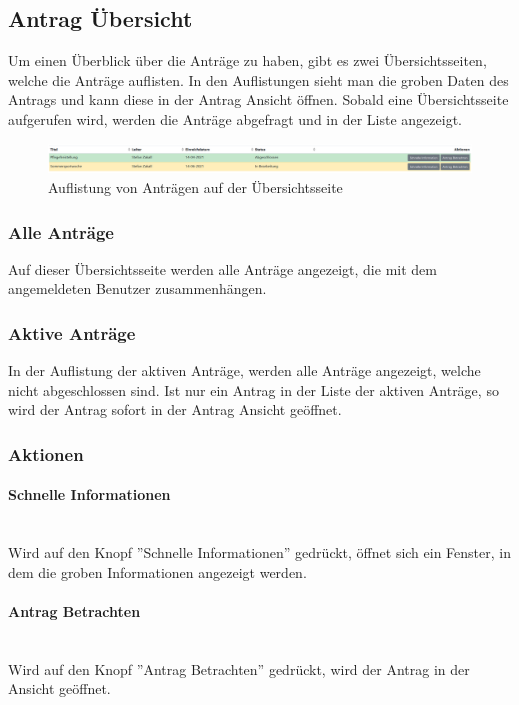 \subsection{Antrag Übersicht}
\label{sec:antrag_uebersicht}
Um einen Überblick über die Anträge zu haben, gibt es zwei Übersichtsseiten, welche die Anträge auflisten. In den Auflistungen sieht man die groben Daten des Antrags und kann diese in der Antrag Ansicht öffnen. Sobald eine Übersichtsseite aufgerufen wird, werden die Anträge abgefragt und in der Liste angezeigt.
\begin{figure}[H]
	\centering
	\includegraphics[width=1\linewidth]{images/liste_antrag}
	\caption[Liste der Anträge]{Auflistung von Anträgen auf der Übersichtsseite}
	\label{fig:listeantrag}
\end{figure}

\subsubsection{Alle Anträge}
Auf dieser Übersichtsseite werden alle Anträge angezeigt, die mit dem angemeldeten Benutzer zusammenhängen.
\subsubsection{Aktive Anträge}
In der Auflistung der aktiven Anträge, werden alle Anträge angezeigt, welche nicht abgeschlossen sind. Ist nur ein Antrag in der Liste der aktiven Anträge, so wird der Antrag sofort in der Antrag Ansicht geöffnet.
\subsubsection{Aktionen}
\paragraph{Schnelle Informationen}~\\
Wird auf den Knopf ''Schnelle Informationen'' gedrückt, öffnet sich ein Fenster, in dem die groben Informationen angezeigt werden.
\paragraph{Antrag Betrachten}~\\
Wird auf den Knopf ''Antrag Betrachten'' gedrückt, wird der Antrag in der Ansicht geöffnet.
\newpage
